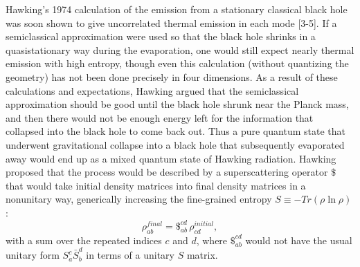 \documentclass[12pt]{article}
\begin{document}
     Hawking's 1974 calculation \cite{Haw74,Haw75} of the emission
from a
stationary classical black hole was soon shown to give uncorrelated
thermal
emission in each mode [3-5].  If a semiclassical
approximation were used so that the black hole shrinks in a
quasistationary way
during the evaporation, one would still expect nearly thermal
emission with
high entropy, though even this calculation (without quantizing the
geometry)
has not been done precisely in four dimensions.  As a result of these
calculations and
expectations, Hawking argued \cite{Haw76} that the semiclassical
approximation
should be good until the black hole shrunk near the Planck mass, and
then there
would not be enough energy left for the information that collapsed
into the
black hole to come back out.  Thus a pure quantum state that
underwent
gravitational collapse into a black hole that subsequently evaporated
away
would end up as a mixed quantum state of Hawking radiation.  Hawking
proposed
that the process would be described by a superscattering operator
$\$$ that
would take initial density matrices into final density matrices in a
nonunitary
way, generically increasing the fine-grained entropy
$S\equiv-Tr(\rho\ln\rho)$:
     	\begin{equation}
	\rho^{\mathit{final}}_{ab}=\$_{ab}^{cd}\,\rho^{\mathit{initial}}_{cd},
	\end{equation}
with a sum over the repeated indices $c$ and $d$,
where $\$_{ab}^{cd}$ would not have the usual unitary form
$S_a^c\bar{S}_b^d$
in terms of a unitary $S$ matrix.
\end{document}

